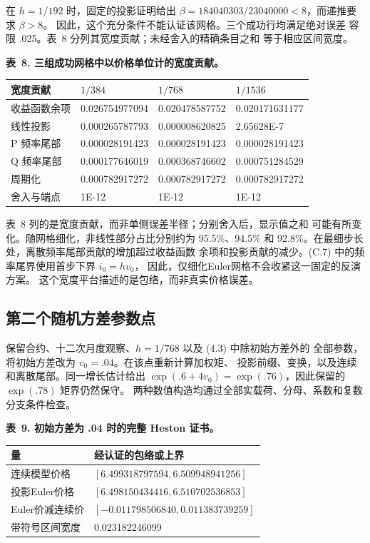 在 \(h=1/192\) 时，固定的投影证明给出
\(\beta=184040303/23040000<8\)，而递推要求 \(\beta>8\)。
因此，这个充分条件不能认证该网格。三个成功行均满足绝对误差
容限 .025。表~8 分列其宽度贡献；未经舍入的精确条目之和
等于相应区间宽度。

\noindent\textbf{表~8. 三组成功网格中以价格单位计的宽度贡献。}
\begin{center}
\begin{tabularx}{\textwidth}{@{}X X X X@{}}
\toprule
宽度贡献 & \(1/384\) & \(1/768\) & \(1/1536\) \\
\midrule
收益函数余项 & 0.026754977094 & 0.020478587752 & 0.020171631177 \\
线性投影 & 0.000265787793 & 0.000008620825 & 2.65628E-7 \\
P 频率尾部 & 0.000028191423 & 0.000028191423 & 0.000028191423 \\
Q 频率尾部 & 0.000177646019 & 0.000368746602 & 0.000751284529 \\
周期化 & 0.000782917272 & 0.000782917272 & 0.000782917272 \\
舍入与端点 & 1E-12 & 1E-12 & 1E-12 \\
\bottomrule
\end{tabularx}
\end{center}

表~8 列的是宽度贡献，而非单侧误差半径；分别舍入后，显示值之和
可能有所变化。随网格细化，非线性部分占比分别约为 95.5\%、94.5\%
和 92.8\%。在最细步长处，离散频率尾部贡献的增加超过收益函数
余项和投影贡献的减少。(C.7) 中的频率尾界使用首步下界 \(i_0=hv_0\)，
因此，仅细化Euler网格不会收紧这一固定的反演方案。
这个宽度平台描述的是包络，而非真实价格误差。


\subsection{第二个随机方差参数点}

保留合约、十二次月度观察、\(h=1/768\) 以及 (4.3) 中除初始方差外的
全部参数，将初始方差改为 \(v_0=.04\)。在该点重新计算加权矩、
投影前缀、变换，以及连续和离散尾部。同一增长估计给出
\(\exp(.6+4v_0)=\exp(.76)\)，因此保留的 \(\exp(.78)\) 矩界仍然保守。
两种数值构造均通过全部实载荷、分母、系数和复数分支条件检查。

\noindent\textbf{表~9. 初始方差为 .04 时的完整 Heston 证书。}
\begin{center}
\begin{tabularx}{\textwidth}{@{}l X@{}}
\toprule
量 & 经认证的包络或上界 \\
\midrule
连续模型价格 & \([6.499318797594,6.509948941256]\) \\
投影Euler价格 & \([6.498150434416,6.510702536853]\) \\
Euler价减连续价 & \([-0.011798506840,0.011383739259]\) \\
带符号区间宽度 & 0.023182246099 \\
\bottomrule
\end{tabularx}
\end{center}

